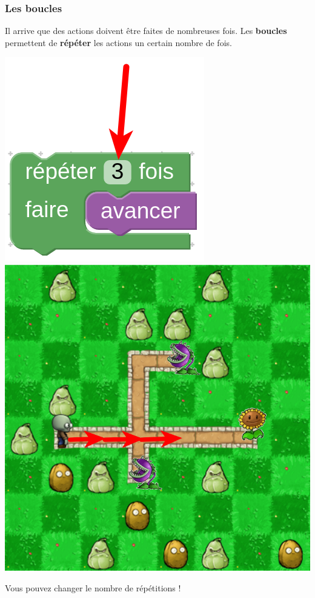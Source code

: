 \documentclass{beamer}
\begin{document}
\begin{frame}
	\frametitle{Les boucles}

	Il arrive que des actions doivent être faites de nombreuses fois. Les \textbf{boucles}
	permettent de \textbf{répéter} les actions un certain nombre de fois.

	\begin{center}
		\includegraphics[width=0.45\linewidth]{blocks_forloop.png}
		\includegraphics[width=0.45\linewidth]{visualization_forloop.png}
	\end{center}

	Vous pouvez changer le nombre de répétitions !
\end{frame}
\end{document}
